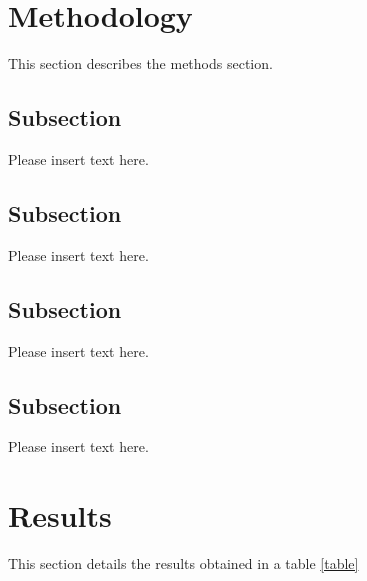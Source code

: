 \documentclass[journal,twocolumn,letterpaper]{IEEEJERM}
\begin{document}





\section{Methodology}

This section describes the methods section.


\subsection*{Subsection}

Please insert text here.


\subsection*{Subsection}

Please insert text here.


\subsection*{Subsection}

Please insert text here.


\subsection*{Subsection}

Please insert text here.


\section{Results}

This section details the results obtained in a table \ref{table}



\end{document}
